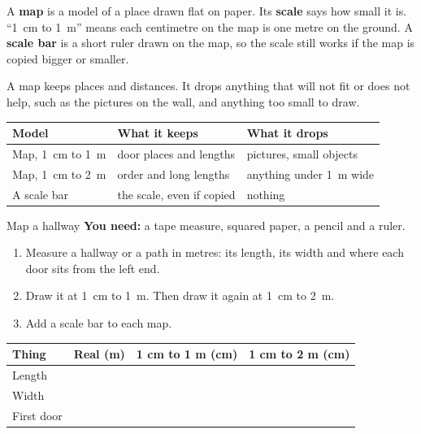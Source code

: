 \label{ch2}

A \textbf{map} is a model of a place drawn flat on paper. Its \textbf{scale} says how small it is. ``1~cm to 1~m'' means each centimetre on the map is one metre on the ground. A \textbf{scale bar} is a short ruler drawn on the map, so the scale still works if the map is copied bigger or smaller.

A map keeps places and distances. It drops anything that will not fit or does not help, such as the pictures on the wall, and anything too small to draw.

\begin{center}
\sffamily\small\renewcommand{\arraystretch}{1.5}
\begin{tabular}{@{}p{3.4cm}p{3.7cm}p{3.7cm}@{}}
\toprule
\textbf{Model} & \textbf{What it keeps} & \textbf{What it drops}\\
\midrule
Map, 1~cm to 1~m & door places and lengths & pictures, small objects\\
Map, 1~cm to 2~m & order and long lengths & anything under 1~m wide\\
A scale bar & the scale, even if copied & nothing\\
\bottomrule
\end{tabular}
\end{center}

\begin{tryit}{Map a hallway}
\textbf{You need:} a tape measure, squared paper, a pencil and a ruler.
\begin{enumerate}[leftmargin=1.6em]
\item Measure a hallway or a path in metres: its length, its width and where each door sits from the left end.
\item Draw it at 1~cm to 1~m. Then draw it again at 1~cm to 2~m.
\item Add a scale bar to each map.
\end{enumerate}
\par\medskip
\renewcommand{\arraystretch}{1.6}
\begin{tabular}{|l|c|c|c|}
\hline
\textbf{Thing} & \textbf{Real (m)} & \textbf{1 cm to 1 m (cm)} & \textbf{1 cm to 2 m (cm)}\\ \hline
Length & & & \\ \hline
Width & & & \\ \hline
First door & & & \\ \hline
\end{tabular}
\end{tryit}

